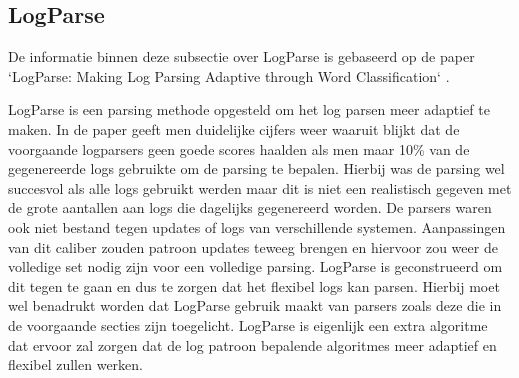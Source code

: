 \subsection{LogParse}
De informatie binnen deze subsectie over LogParse is gebaseerd op de paper `LogParse: Making Log Parsing Adaptive through Word Classification` \autocite{LogParse2020}. 

LogParse is een parsing methode opgesteld om het log parsen meer adaptief te maken. In de paper geeft men duidelijke cijfers weer waaruit blijkt dat de voorgaande logparsers geen goede scores haalden als men maar 10\% van de gegenereerde logs gebruikte om de parsing te bepalen. Hierbij was de parsing wel succesvol als alle logs gebruikt werden maar dit is niet een realistisch gegeven met de grote aantallen aan logs die dagelijks gegenereerd worden. De parsers waren ook niet bestand tegen updates of logs van verschillende systemen. Aanpassingen van dit caliber zouden patroon updates teweeg brengen en hiervoor zou weer de volledige set nodig zijn voor een volledige parsing. LogParse is geconstrueerd om dit tegen te gaan en dus te zorgen dat het flexibel logs kan parsen. Hierbij moet wel benadrukt worden dat LogParse gebruik maakt van parsers zoals deze die in de voorgaande secties zijn toegelicht. LogParse is eigenlijk een extra algoritme dat ervoor zal zorgen dat de log patroon bepalende algoritmes meer adaptief en flexibel zullen werken.\\

